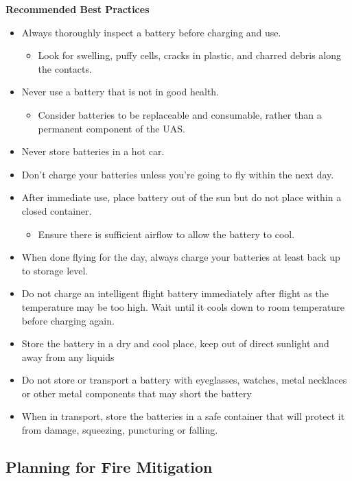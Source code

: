 \documentclass[
  12pt,
]{book}
\providecommand{\tightlist}{%
  \setlength{\itemsep}{0pt}\setlength{\parskip}{0pt}}
\begin{document}
\textbf{Recommended Best Practices}

\begin{itemize}
\item
  Always thoroughly inspect a battery before charging and use.

  \begin{itemize}
  \tightlist
  \item
    Look for swelling, puffy cells, cracks in plastic, and charred debris along the contacts.
  \end{itemize}
\item
  Never use a battery that is not in good health.

  \begin{itemize}
  \tightlist
  \item
    Consider batteries to be replaceable and consumable, rather than a permanent component of the UAS.
  \end{itemize}
\item
  Never store batteries in a hot car.
\item
  Don't charge your batteries unless you're going to fly within the next day.
\item
  After immediate use, place battery out of the sun but do not place within a closed container.

  \begin{itemize}
  \tightlist
  \item
    Ensure there is sufficient airflow to allow the battery to cool.
  \end{itemize}
\item
  When done flying for the day, always charge your batteries at least back up to storage level.
\item
  Do not charge an intelligent flight battery immediately after flight as the temperature may be too high. Wait until it cools down to room temperature before charging again.
\item
  Store the battery in a dry and cool place, keep out of direct sunlight and away from any liquids
\item
  Do not store or transport a battery with eyeglasses, watches, metal necklaces or other metal components that may short the battery
\item
  When in transport, store the batteries in a safe container that will protect it from damage, squeezing, puncturing or falling.
\end{itemize}

\subsection{Planning for Fire Mitigation}\label{planning-for-fire-mitigation}
\end{document}
